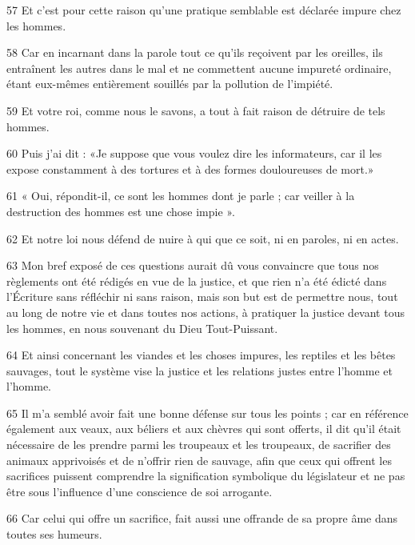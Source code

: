 \par 57 Et c'est pour cette raison qu'une pratique semblable est déclarée impure chez les hommes.

\par 58 Car en incarnant dans la parole tout ce qu'ils reçoivent par les oreilles, ils entraînent les autres dans le mal et ne commettent aucune impureté ordinaire, étant eux-mêmes entièrement souillés par la pollution de l'impiété.

\par 59 Et votre roi, comme nous le savons, a tout à fait raison de détruire de tels hommes.

\par 60 Puis j'ai dit : «Je suppose que vous voulez dire les informateurs, car il les expose constamment à des tortures et à des formes douloureuses de mort.»

\par 61 « Oui, répondit-il, ce sont les hommes dont je parle ; car veiller à la destruction des hommes est une chose impie ».

\par 62 Et notre loi nous défend de nuire à qui que ce soit, ni en paroles, ni en actes.

\par 63 Mon bref exposé de ces questions aurait dû vous convaincre que tous nos règlements ont été rédigés en vue de la justice, et que rien n'a été édicté dans l'Écriture sans réfléchir ni sans raison, mais son but est de permettre nous, tout au long de notre vie et dans toutes nos actions, à pratiquer la justice devant tous les hommes, en nous souvenant du Dieu Tout-Puissant.

\par 64 Et ainsi concernant les viandes et les choses impures, les reptiles et les bêtes sauvages, tout le système vise la justice et les relations justes entre l'homme et l'homme.

\par 65 Il m'a semblé avoir fait une bonne défense sur tous les points ; car en référence également aux veaux, aux béliers et aux chèvres qui sont offerts, il dit qu'il était nécessaire de les prendre parmi les troupeaux et les troupeaux, de sacrifier des animaux apprivoisés et de n'offrir rien de sauvage, afin que ceux qui offrent les sacrifices puissent comprendre la signification symbolique du législateur et ne pas être sous l'influence d'une conscience de soi arrogante.

\par 66 Car celui qui offre un sacrifice, fait aussi une offrande de sa propre âme dans toutes ses humeurs.

